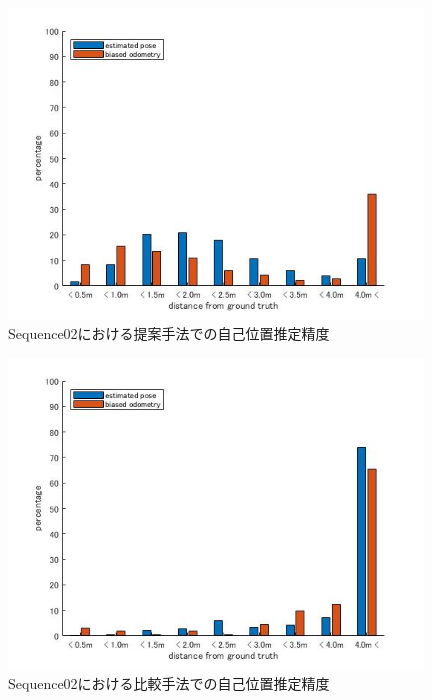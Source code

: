 \begin{figure}[htbp]
  \begin{minipage}{1.0\hsize}
  \begin{center}
   \includegraphics[width=110mm]{./picture/mesh_s2_xyz.jpg}
  \end{center}
  \caption{Sequence02における提案手法での自己位置推定精度}
  \label{fig:mesh_sequence02_XYZ}
 \end{minipage}
\end{figure}

\begin{figure}[htbp]
 \begin{minipage}{1.0\hsize}
  \begin{center}
   \includegraphics[width=110mm]{./picture/point_s2_xyz.jpg}
  \end{center}
  \caption{Sequence02における比較手法での自己位置推定精度}
  \label{fig:point_sequence02_XYZ}
 \end{minipage}
\end{figure}

